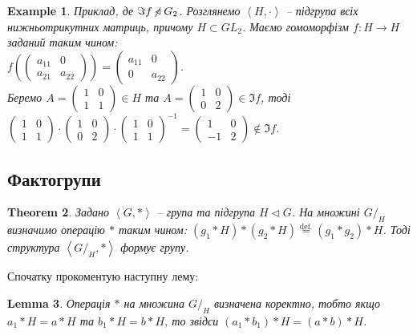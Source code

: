 \documentclass[a4paper, 10pt]{article}
\theoremstyle{theoremdd}
\newtheorem{theorem}{Theorem}[subsection]
\theoremstyle{theoremdd}
\theoremstyle{theoremdd}
\theoremstyle{theoremdd}
\theoremstyle{theoremdd}
\newtheorem{example}[theorem]{Example}
\theoremstyle{theoremdd}
\theoremstyle{theoremdd}
\theoremstyle{theoremdd}
\theoremstyle{theoremdd}
\theoremstyle{theoremdd}
\theoremstyle{theoremdd}
\theoremstyle{theoremdd}
\theoremstyle{theoremdd}
\newtheorem{lemma}[theorem]{Lemma}
\theoremstyle{theoremdd}
\theoremstyle{theoremdd}
\newcommand{\eqbydef}{\overset{\text{def.}}{=}}
\begin{document}
\begin{example}
Приклад, де $\Im f \centernot\triangleleft G_2$. Розглянемо $\left<H, \cdot \right>$ -- підгрупа всіх нижньотрикутних матриць, причому $H \subset GL_2$. Маємо гомоморфізм $f \colon H \to H$ заданий таким чином:\\
$f\left( \begin{pmatrix}
a_{11} & 0 \\
a_{21} & a_{22}
\end{pmatrix} \right) = \begin{pmatrix}
a_{11} & 0 \\
0 & a_{22}
\end{pmatrix}$.\\
Беремо $A = \begin{pmatrix}
1 & 0 \\
1 & 1
\end{pmatrix} \in H$ та $A = \begin{pmatrix}
1 & 0 \\
0 & 2
\end{pmatrix} \in \Im f$, тоді\\
$\begin{pmatrix}
1 & 0 \\
1 & 1
\end{pmatrix} \cdot \begin{pmatrix}
1 & 0 \\
0 & 2
\end{pmatrix} \cdot \begin{pmatrix}
1 & 0 \\
1 & 1
\end{pmatrix}^{-1} = \begin{pmatrix}
1 & 0 \\
-1 & 2
\end{pmatrix} \not \in \Im f$.
\end{example}

\subsection{Фактогрупи}
\begin{theorem}
Задано $\left< G,* \right>$ -- група та підгрупа $H \triangleleft G$. На множині $G/_H$ визначимо операцію $*$ таким чином: $(g_1*H) * (g_2*H) \eqbydef (g_1*g_2)*H$. Тоді структура $\left< G/_H, * \right>$ формує групу.
\end{theorem}

Спочатку прокоментую наступну лему:
\begin{lemma}
Операція $*$ на множина $G/_H$ визначена коректно, тобто якщо $a_1*H = a*H$ та $b_1*H = b*H$, то звідси $(a_1*b_1)*H = (a*b)*H$.
\end{lemma}
\end{document}
